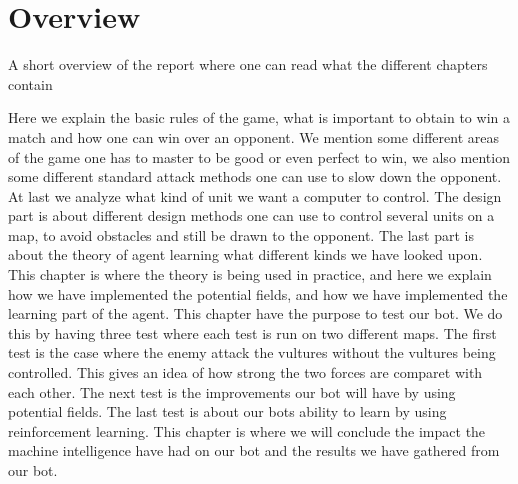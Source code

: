 \section{Overview}
	A short overview of the report where one can read what the different chapters contain

Here we explain the basic rules of the game, what is important to obtain to win a match and how one can win over an opponent. We mention some different areas of the game one has to master to be good or even perfect to win, we also mention some different standard attack methods one can use to slow down the opponent. At last we analyze what kind of unit we want a computer to control.
The design part is about different design methods one can use to control several units on a map, to avoid obstacles and still be drawn to the opponent. The last part is about the theory of agent learning what different kinds we have looked upon.
This chapter is where the theory is being used in practice, and here we explain how we have implemented the potential fields, and how we have implemented the learning part of the agent.
This chapter have the purpose to test our bot. We do this by having three test where each test is run on two different maps. The first test is the case
where the enemy attack the vultures without the vultures being controlled. This gives an idea of how strong the two forces are comparet with each other. The next test is the improvements our bot will have by using potential fields. The last test is about our bots ability to learn by using reinforcement learning.
This chapter is where we will conclude the impact the machine intelligence have had on our bot and the results we have gathered from our bot.
